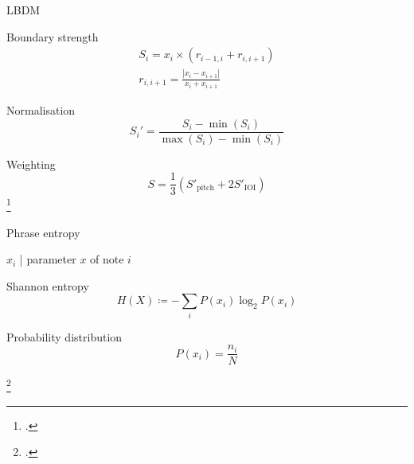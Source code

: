 \documentclass{beamer}
\begin{document}
\begin{frame}{LBDM}

    \begin{block}{Boundary strength}
        \begin{gather*}
            S_i=x_i\times (r_{i-1, i} + r_{i, i+1}) \\
            r_{i, i+1}=\frac{|x_{i}-x_{i+1}|}{x_{i}+x_{i+1}}
        \end{gather*}
    \end{block}
    \begin{block}{Normalisation}
        \begin{equation*}
            S_i'=\frac{S_i-\min(S_i)}{\max(S_i)-\min(S_i)}
        \end{equation*}
    \end{block}
    \begin{block}{Weighting}
        \begin{equation*}
            S=\frac{1}{3}\left( S'_\mathrm{pitch} + 2 S'_\mathrm{IOI} \right)
        \end{equation*}
        \hfill\footcite{cambouropoulos_lbdm_2011}
    \end{block}
    
\end{frame}

\begin{frame}{Phrase entropy}

    $x_i$ | parameter $x$ of note $i$
    \begin{block}{Shannon entropy}
        \begin{equation*}
            H(X)\coloneq-\sum_i P(x_i)\log_2 P(x_i)
        \end{equation*}
    \end{block}
    \begin{block}{Probability distribution}
        \begin{equation*}
            P(x_i)=\frac{n_i}{N}
        \end{equation*}
    \end{block}
    \hfill\footcite{li_automatic_2019}

\end{frame}
\end{document}
